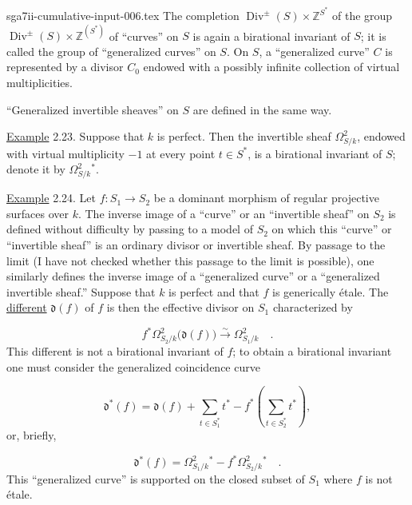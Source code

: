 \begin{filecontents*}{sga7ii-cumulative-input-006.tex}
The completion
$\operatorname{Div}^{\pm}(S)\times\mathbb Z^{S^*}$ of the group
$\operatorname{Div}^{\pm}(S)\times\mathbb Z^{(S^*)}$ of ``curves'' on $S$ is
again a birational invariant of $S$; it is called the group of ``generalized
curves'' on $S$.  On $S$, a ``generalized curve'' $C$ is represented by a
divisor $C_0$ endowed with a possibly infinite collection of virtual
multiplicities.

``Generalized invertible sheaves'' on $S$ are defined in the same way.


\underline{Example} 2.23. Suppose that $k$ is perfect.  Then the invertible
sheaf $\Omega^2_{S/k}$, endowed with virtual multiplicity $-1$ at every point
$t\in S^*$, is a birational invariant of $S$; denote it by
$\Omega^2_{S/k}{}^*$.

\underline{Example} 2.24. Let $f:S_1\longrightarrow S_2$ be a dominant
morphism of regular projective surfaces over $k$.  The inverse image of a
``curve'' or an ``invertible sheaf'' on $S_2$ is defined without difficulty by
passing to a model of $S_2$ on which this ``curve'' or ``invertible sheaf'' is
an ordinary divisor or invertible sheaf.  By passage to the limit (I have not
checked whether this passage to the limit is possible), one similarly defines
the inverse image of a ``generalized curve'' or a ``generalized invertible
sheaf.''  Suppose that $k$ is perfect and that $f$ is generically \'{e}tale.
The \underline{different} $\mathfrak d(f)$ of $f$ is then the effective divisor
on $S_1$ characterized by

\begin{equation*}
f^*\Omega^2_{S_2/k}\bigl(\mathfrak d(f)\bigr)
\overset{\sim}{\longrightarrow}\Omega^2_{S_1/k} \quad .
\end{equation*}
This different is not a birational invariant of $f$; to obtain a birational
invariant one must consider the generalized coincidence curve

\begin{equation*}
\mathfrak d^*(f)=\mathfrak d(f)+\sum_{t\in S_1^*}t^*
-f^*\left(\sum_{t\in S_2^*}t^*\right),
\end{equation*}
or, briefly,

\begin{equation*}
\mathfrak d^*(f)=\Omega^2_{S_1/k}{}^*
-f^*\Omega^2_{S_2/k}{}^* \quad .
\end{equation*}
This ``generalized curve'' is supported on the closed subset of $S_1$ where
$f$ is not \'{e}tale.
\end{filecontents*}
